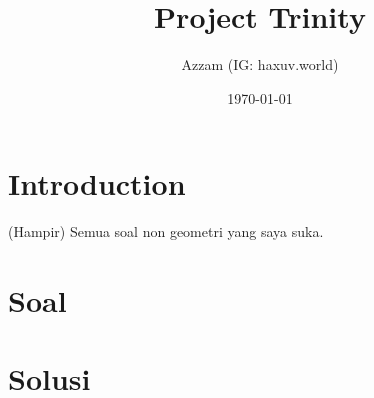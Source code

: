 

\title{Project Trinity}
\author{Azzam (IG: haxuv.world)}
\date{\today}



\maketitle

\renewcommand*\contentsname{Daftar Isi}
\tableofcontents

\newpage

\section{Introduction}
(Hampir) Semua soal non geometri yang saya suka. 

\section{Soal}


\newpage
\section{Solusi}




